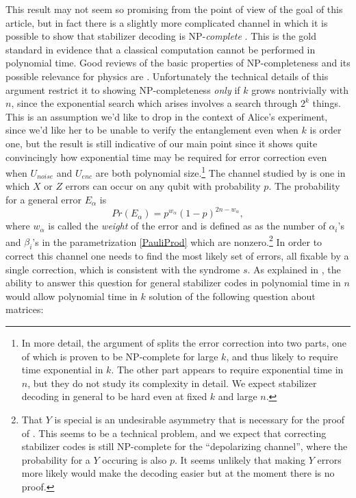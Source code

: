 \documentclass[12pt]{article}
\newcommand{\be}{\begin{equation}}
\newcommand{\ee}{\end{equation}}
\newcommand{\textcs}[1]{\textsf{#1}}
\newcommand{\NP}{\textcs{NP}}
\begin{document}
This result may not seem so promising from the point of view of the goal of this article, but in fact there is a slightly more complicated channel in which it is possible to show that stabilizer decoding is \NP-\textit{complete} \cite{berlekamp1978inherent,hsieh2011np}.  This is the gold standard in evidence that a classical computation cannot be performed in polynomial time. Good reviews of the basic properties of \NP-completeness and its possible relevance for physics are \cite{Denef:2006ad,Aaronson:2005qu}.  Unfortunately the technical details of this argument restrict it to showing \NP-completeness \textit{only} if $k$ grows nontrivially with $n$, since the exponential search which arises involves a search through $2^k$ things.  This is an assumption we'd like to drop in the context of Alice's experiment, since we'd like her to be unable to verify the entanglement even when $k$ is order one, but the result is still indicative of our main point since it shows quite convincingly how exponential time may be required for error correction even when $U_{noise}$ and $U_{enc}$ are both polynomial size.\footnote{In more detail, the argument of \cite{hsieh2011np} splits the error correction into two parts, one of which is proven to be \NP-complete for large $k$, and thus likely to require time exponential in $k$.  The other part appears to require exponential time in $n$, but they do not study its complexity in detail.  We expect stabilizer decoding in general to be hard even at fixed $k$ and large $n$.}  The channel studied by \cite{hsieh2011np} is one in which $X$ or $Z$ errors can occur on any qubit with probability $p$.  The probability for a general error $E_{\alpha}$ is 
\be
Pr(E_\alpha)=p^{w_{\alpha}}(1-p)^{2n-w_{\alpha}},
\ee
where $w_{\alpha}$ is called the \textit{weight} of the error and is defined as as the number of $\alpha_i$'s and $\beta_i$'s in the parametrization \eqref{PauliProd} which are nonzero.\footnote{That $Y$ is special is an undesirable asymmetry that is necessary for the proof of \cite{hsieh2011np}.  This seems to be a technical problem, and we expect that correcting stabilizer codes is still \NP-complete for the ``depolarizing channel'', where the probability for a $Y$ occuring is also $p$.  It seems unlikely that making $Y$ errors more likely would make the decoding easier but at the moment there is no proof.}  In order to correct this channel one needs to find the most likely set of errors, all fixable by a single correction, which is consistent with the syndrome $s$.  As explained in \cite{hsieh2011np}, the ability to answer this question for general stabilizer codes in polynomial time in $n$ would allow polynomial time in $k$ solution of the following question about matrices:
\end{document}
